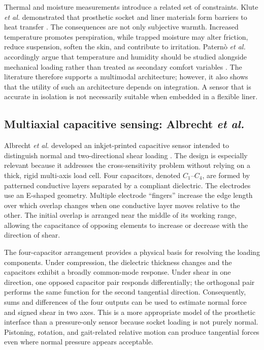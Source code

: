 \documentclass[12pt,a4paper]{article}
\begin{document}
Thermal and moisture measurements introduce a related set of constraints.
Klute \textit{et al.} demonstrated that prosthetic socket and liner materials
form barriers to heat transfer \cite{klute2007}. The consequences are not only
subjective warmth. Increased temperature promotes perspiration, while trapped
moisture may alter friction, reduce suspension, soften the skin, and contribute
to irritation. Paternò \textit{et al.} accordingly argue that temperature and
humidity should be studied alongside mechanical loading rather than treated as
secondary comfort variables \cite{paterno2020}. The literature therefore
supports a multimodal architecture; however, it also shows that the utility of
such an architecture depends on integration. A sensor that is accurate in
isolation is not necessarily suitable when embedded in a flexible liner.

\subsection{Multiaxial capacitive sensing: Albrecht \textit{et al.}}

Albrecht \textit{et al.} developed an inkjet-printed capacitive sensor intended
to distinguish normal and two-directional shear loading
\cite{albrecht2019}. The design is especially relevant because it addresses
the cross-sensitivity problem without relying on a thick, rigid multi-axis load
cell. Four capacitors, denoted \(C_1\)--\(C_4\), are formed by patterned
conductive layers separated by a compliant dielectric. The electrodes use an
E-shaped geometry. Multiple electrode ``fingers'' increase the edge length over
which overlap changes when one conductive layer moves relative to the other.
The initial overlap is arranged near the middle of its working range, allowing
the capacitance of opposing elements to increase or decrease with the direction
of shear.

The four-capacitor arrangement provides a physical basis for resolving the
loading components. Under compression, the dielectric thickness changes and
the capacitors exhibit a broadly common-mode response. Under shear in one
direction, one opposed capacitor pair responds differentially; the orthogonal
pair performs the same function for the second tangential direction.
Consequently, sums and differences of the four outputs can be used to estimate
normal force and signed shear in two axes. This is a more appropriate model of
the prosthetic interface than a pressure-only sensor because socket loading is
not purely normal. Pistoning, rotation, and gait-related relative motion can
produce tangential forces even where normal pressure appears acceptable.
\end{document}
